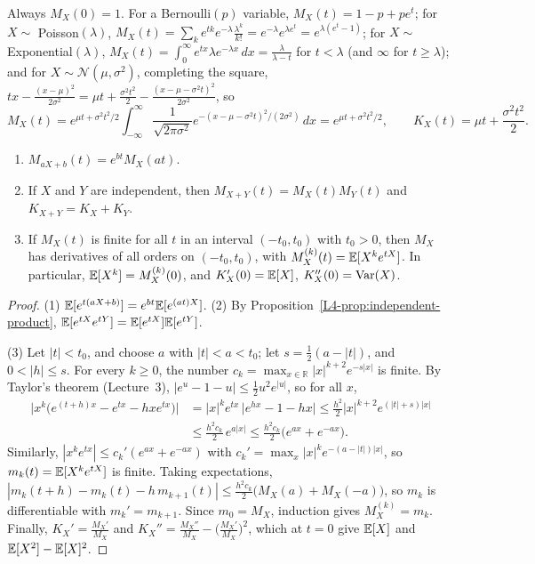 Always $M_X(0) = 1$. For a Bernoulli$(p)$ variable, $M_X(t) = 1 - p + pe^t$; for $X \sim$ Poisson$(\lambda)$, $M_X(t) = \sum_k e^{tk}e^{-\lambda}\frac{\lambda^k}{k!} = e^{-\lambda}e^{\lambda e^t} = e^{\lambda(e^t - 1)}$; for $X \sim$ Exponential$(\lambda)$, $M_X(t) = \int_0^\infty e^{tx}\lambda e^{-\lambda x}\, dx = \frac{\lambda}{\lambda - t}$ for $t < \lambda$ (and $\infty$ for $t \geq \lambda$); and for $X \sim \mathcal{N}(\mu, \sigma^2)$, completing the square, $tx - \frac{(x - \mu)^2}{2\sigma^2} = \mu t + \frac{\sigma^2t^2}{2} - \frac{(x - \mu - \sigma^2t)^2}{2\sigma^2}$, so
\[M_X(t) = e^{\mu t + \sigma^2t^2/2} \int_{-\infty}^\infty \frac{1}{\sqrt{2\pi\sigma^2}}e^{-(x - \mu - \sigma^2t)^2/(2\sigma^2)}\, dx = e^{\mu t + \sigma^2t^2/2}, \qquad K_X(t) = \mu t + \frac{\sigma^2t^2}{2}.\]

\begin{proposition}\label{L4-prop:mgf}
    \begin{enumerate}
        \item $M_{aX + b}(t) = e^{bt}M_X(at)$.
        \item If $X$ and $Y$ are independent, then $M_{X+Y}(t) = M_X(t)M_Y(t)$ and $K_{X+Y} = K_X + K_Y$.
        \item If $M_X(t)$ is finite for all $t$ in an interval $(-t_0, t_0)$ with $t_0 > 0$, then $M_X$ has derivatives of all orders on $(-t_0, t_0)$, with $M_X^{(k)}(t) = \mathbb{E}[X^ke^{tX}]$. In particular, $\mathbb{E}[X^k] = M_X^{(k)}(0)$, and $K_X'(0) = \mathbb{E}[X]$, $K_X''(0) = \operatorname{Var}(X)$.
    \end{enumerate}
\end{proposition}

\begin{proof}
    (1) $\mathbb{E}[e^{t(aX + b)}] = e^{bt}\mathbb{E}[e^{(at)X}]$. (2) By Proposition~\ref{L4-prop:independent-product}, $\mathbb{E}[e^{tX}e^{tY}] = \mathbb{E}[e^{tX}]\mathbb{E}[e^{tY}]$.

    (3) Let $|t| < t_0$, and choose $a$ with $|t| < a < t_0$; let $s = \frac{1}{2}(a - |t|)$, and $0 < |h| \leq s$. For every $k \geq 0$, the number $c_k = \max_{x \in \mathbb{R}} |x|^{k+2}e^{-s|x|}$ is finite. By Taylor's theorem (Lecture~3), $|e^u - 1 - u| \leq \frac{1}{2}u^2e^{|u|}$, so for all $x$,
    \begin{align*}
        \big|x^k\big(e^{(t+h)x} - e^{tx} - hxe^{tx}\big)\big| &= |x|^ke^{tx}\,\big|e^{hx} - 1 - hx\big| \leq \frac{h^2}{2}|x|^{k+2}e^{(|t| + s)|x|} \\
        &\leq \frac{h^2c_k}{2}\,e^{a|x|} \leq \frac{h^2c_k}{2}\big(e^{ax} + e^{-ax}\big).
    \end{align*}
    Similarly, $|x^ke^{tx}| \leq c_k'(e^{ax} + e^{-ax})$ with $c_k' = \max_x |x|^ke^{-(a - |t|)|x|}$, so $m_k(t) = \mathbb{E}[X^ke^{tX}]$ is finite. Taking expectations, $|m_k(t + h) - m_k(t) - h\,m_{k+1}(t)| \leq \frac{h^2c_k}{2}\big(M_X(a) + M_X(-a)\big)$, so $m_k$ is differentiable with $m_k' = m_{k+1}$. Since $m_0 = M_X$, induction gives $M_X^{(k)} = m_k$. Finally, $K_X' = \frac{M_X'}{M_X}$ and $K_X'' = \frac{M_X''}{M_X} - \big(\frac{M_X'}{M_X}\big)^2$, which at $t = 0$ give $\mathbb{E}[X]$ and $\mathbb{E}[X^2] - \mathbb{E}[X]^2$.
\end{proof}


